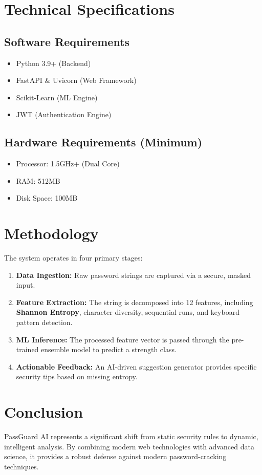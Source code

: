 \documentclass[12pt,a4paper]{article}
\begin{document}
\section{Technical Specifications}
\subsection{Software Requirements}
\begin{itemize}[noitemsep]
    \item Python 3.9+ (Backend)
    \item FastAPI \& Uvicorn (Web Framework)
    \item Scikit-Learn (ML Engine)
    \item JWT (Authentication Engine)
\end{itemize}

\subsection{Hardware Requirements (Minimum)}
\begin{itemize}[noitemsep]
    \item Processor: 1.5GHz+ (Dual Core)
    \item RAM: 512MB
    \item Disk Space: 100MB
\end{itemize}

\section{Methodology}
The system operates in four primary stages:
\begin{enumerate}
    \item \textbf{Data Ingestion:} Raw password strings are captured via a secure, masked input.
    \item \textbf{Feature Extraction:} The string is decomposed into 12 features, including \textbf{Shannon Entropy}, character diversity, sequential runs, and keyboard pattern detection.
    \item \textbf{ML Inference:} The processed feature vector is passed through the pre-trained ensemble model to predict a strength class.
    \item \textbf{Actionable Feedback:} An AI-driven suggestion generator provides specific security tips based on missing entropy.
\end{enumerate}

\section{Conclusion}
PassGuard AI represents a significant shift from static security rules to dynamic, intelligent analysis. By combining modern web technologies with advanced data science, it provides a robust defense against modern password-cracking techniques.
\end{document}
